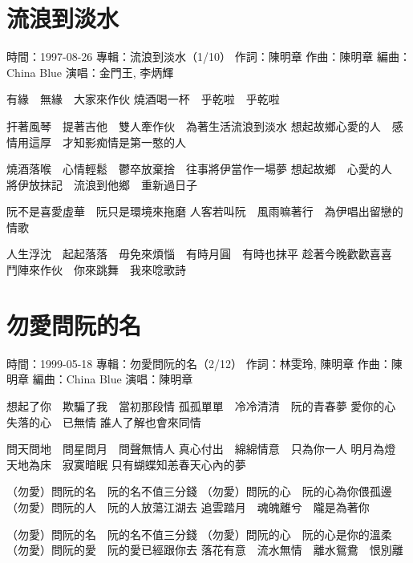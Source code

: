\documentclass[UTF8,a4paper,oneside,twocolumn,12pt]{ctexbook}
\newcommand{\infopair}[2]{\textbullet #1：#2}
\newcommand{\zc}[1][伍佰]{\infopair{作詞}{#1}}
\newcommand{\zq}[1][伍佰]{\infopair{作曲}{#1}}
\newcommand{\bq}[1][伍佰]{\infopair{編曲}{#1}}
\newcommand{\zj}[1]{\infopair{專輯}{#1}}
\newcommand{\sj}[1]{\infopair{時間}{#1}}
\newenvironment{info}{\begin{flushleft}\kaishu
	}
	{\end{flushleft}\normalsize\yahei\par}
\newenvironment{lyric}{
	}
{}
\begin{document}
\section{流浪到淡水}
\begin{info}
	\sj{1997-08-26}%
	\zj{流浪到淡水（1/10）}
	\zc[陳明章]
	\zq[陳明章]
	\bq[China Blue]
	\infopair{演唱}{金門王, 李炳輝}
\end{info}
\begin{lyric}
	有緣　無緣　大家來作伙
	燒酒喝一杯　乎乾啦　乎乾啦

	扞著風琴　提著吉他　雙人牽作伙　為著生活流浪到淡水
	想起故鄉心愛的人　感情用這厚　才知影痴情是第一憨的人

	燒酒落喉　心情輕鬆　鬱卒放棄捨　往事將伊當作一場夢
	想起故鄉　心愛的人　將伊放抹記　流浪到他鄉　重新過日子

	阮不是喜愛虛華　阮只是環境來拖磨
	人客若叫阮　風雨嘛著行　為伊唱出留戀的情歌

	人生浮沈　起起落落　毋免來煩惱　有時月圓　有時也抹平
	趁著今晚歡歡喜喜　鬥陣來作伙　你來跳舞　我來唸歌詩
\end{lyric}

\section{勿愛問阮的名}
\begin{info}
	\sj{1999-05-18}
	\zj{勿愛問阮的名（2/12）}
	\zc[林雯玲, 陳明章]
	\zq[陳明章]
	\bq[China Blue]
	\infopair{演唱}{陳明章}
\end{info}
\begin{lyric}
	想起了你　欺騙了我　當初那段情
	孤孤單單　冷冷清清　阮的青春夢
	愛你的心　失落的心　已無情
	誰人了解也會來同情

	問天問地　問星問月　問聲無情人
	真心付出　綿綿情意　只為你一人
	明月為燈　天地為床　寂寞暗眠
	只有蝴蝶知恙春天心內的夢

	（勿愛）問阮的名　阮的名不值三分錢
	（勿愛）問阮的心　阮的心為你偎孤邊
	（勿愛）問阮的人　阮的人放蕩江湖去
	追雲踏月　魂魄離兮　隴是為著你

	（勿愛）問阮的名　阮的名不值三分錢
	（勿愛）問阮的心　阮的心是你的溫柔
	（勿愛）問阮的愛　阮的愛已經跟你去
	落花有意　流水無情　離水鴛鴦　恨別離
\end{lyric}
\end{document}
